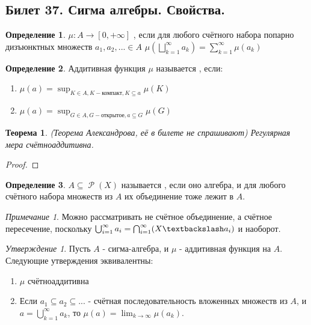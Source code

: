 \documentclass[a4paper]{article}
\theoremstyle{indented}
\newtheorem{theorem}{Теорема}
\theoremstyle{definition}
\newtheorem{defn}{Определение}
\theoremstyle{remark}
\newtheorem{remark}{Примечание}
\newtheorem{stat}{Утверждение}
\DeclareMathOperator{\ra}{\rightarrow}
\DeclareMathOperator{\Rho}{\mathcal{P}}
\begin{document}
\subsection{Билет 37. Сигма алгебры. Свойства.}
\begin{defn}
$\mu: A \ra [0, +\infty]$ , если для любого счётного набора попарно дизъюнктных множеств $a_1, a_2,... \in A$ $\mu(\bigsqcup_{k=1}^{\infty}a_k)=\sum_{k=1}^{\infty} \mu(a_k)$
\end{defn}
\begin{defn}
Аддитивная функция $\mu$ называется , если:
\begin{enumerate}
    \item $\mu(a)=\sup_{K \in A, K - \text{компакт}, K \subseteq a} \mu(K)$
    \item $\mu(a)=\sup_{G \in A, G - \text{открытое}, a \subseteq G} \mu(G)$
\end{enumerate}
\end{defn}
\begin{theorem}
(Теорема Александрова, её в билете не спрашивают) Регулярная мера счётноаддитивна.
\end{theorem}
\begin{proof}

\end{proof}
\begin{defn}
$A \subseteq \Rho(X)$ называется , если оно алгебра, и для любого счётного набора множеств из $A$ их объединение тоже лежит в $A$. 
\end{defn}
\begin{remark}
Можно рассматривать не счётное объединение, а счётное пересечение, поскольку $\bigcup_{i=1}^{\infty} a_i = \bigcap_{i=1}^{\infty} (X \textbackslash a_i)$ и наоборот.
\end{remark}
\begin{stat}
Пусть $A$ - сигма-алгебра, и $\mu$ - аддитивная функция на $A$. Следующие утверждения эквивалентны:
\begin{enumerate}
    \item $\mu$ счётноаддитивна
    \item Если $a_1 \subseteq a_2 \subseteq ... $ - счётная последовательность вложенных множеств из $A$, и $a=\bigcup_{k=1}^{\infty} a_k$, то $\mu(a)= \lim_{k \ra \infty} \mu(a_k)$.
\end{enumerate}
\end{stat}
\end{document}
